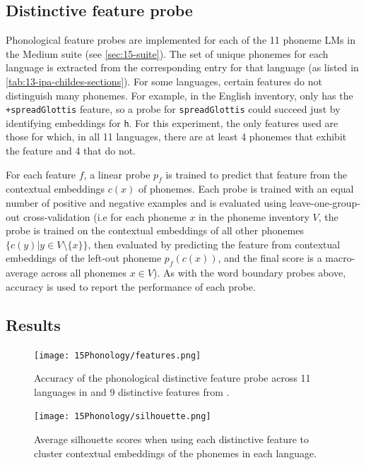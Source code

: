 \subsection{Distinctive feature probe}

Phonological feature probes are implemented for each of the 11 phoneme LMs in the Medium suite (see \cref{sec:15-suite}). The set of unique phonemes for each language is extracted from the corresponding \phoible entry for that language (as listed in \cref{tab:13-ipa-childes-sections}). For some languages, certain features do not distinguish many phonemes. For example, in the English \phoible inventory, only  has the \texttt{+spreadGlottis} feature, so a probe for \texttt{spreadGlottis} could succeed just by identifying embeddings for \texttt{h}. For this experiment, the only features used are those for which, in all 11 languages, there are at least 4 phonemes that exhibit the feature and 4 that do not. 

For each feature $f$, a linear probe $p_f$ is trained to predict that feature from the contextual embeddings $c(x)$ of phonemes. Each probe is trained with an equal number of positive and negative examples and is evaluated using leave-one-group-out cross-validation (i.e for each phoneme $x$ in the phoneme inventory $V$, the probe is trained on the contextual embeddings of all other phonemes $\{c(y) | y\in V \setminus \{x\}\}$, then evaluated by predicting the feature from contextual embeddings of the left-out phoneme $p_f(c(x))$, and the final score is a macro-average across all phonemes $x\in V$). As with the word boundary probes above, accuracy is used to report the performance of each probe.

\subsection{Results}

\begin{figure}[t]
    \centering
    \texttt{[image: 15Phonology/features.png]}
    \caption{Accuracy of the phonological distinctive feature probe across 11 languages in \ipachildes and 9 distinctive features from \phoible.}
    \label{fig:features}
\end{figure}

\begin{figure}[t]
    \centering
    \texttt{[image: 15Phonology/silhouette.png]}
    \caption{Average silhouette scores when using each distinctive feature to cluster contextual embeddings of the phonemes in each language.}
    \label{fig:silhouette}
\end{figure}

